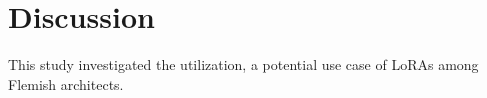 \chapter{Discussion}
This study investigated the utilization, a potential use case of LoRAs among Flemish architects.



